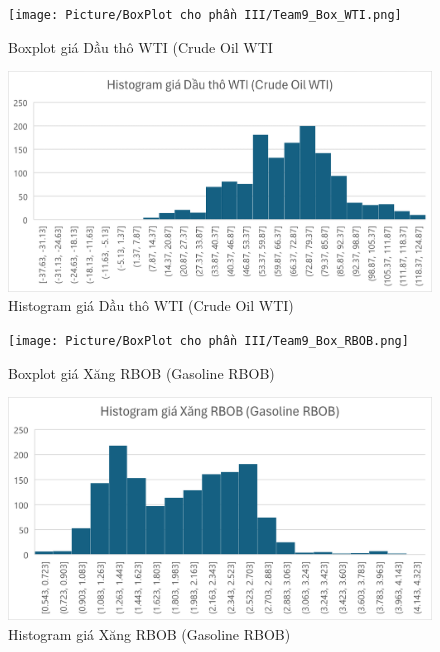 \documentclass[conference]{IEEEtran}
\begin{document}
\begin{figure}[H]
    \centering
    \begin{minipage}{0.23\textwidth}
    \centering
    \texttt{[image: Picture/BoxPlot cho phần III/Team9\_Box\_WTI.png]}
    \caption{Boxplot giá Dầu thô WTI (Crude Oil WTI}
    \label{fig:1}
    \end{minipage}
    \hfill
    \begin{minipage}{0.23\textwidth}
    \centering
    \includegraphics[width=1\textwidth]{Picture/Histogram cho ở phần III/Team9_His_WTI.png}
    \caption{Histogram giá Dầu thô WTI (Crude Oil WTI)}
    \label{fig:2}
    \end{minipage}
\end{figure}

\begin{figure}[H]
    \centering
    \begin{minipage}{0.23\textwidth}
    \centering
    \texttt{[image: Picture/BoxPlot cho phần III/Team9\_Box\_RBOB.png]}
    \caption{Boxplot giá Xăng RBOB (Gasoline RBOB)}
    \label{fig:1}
    \end{minipage}
    \hfill
    \begin{minipage}{0.23\textwidth}
    \centering
    \includegraphics[width=1\textwidth]{Picture/Histogram cho ở phần III/Team9_His_RBOB.png}
    \caption{Histogram giá Xăng RBOB (Gasoline RBOB)}
    \label{fig:2}
    \end{minipage}
\end{figure}
\end{document}
